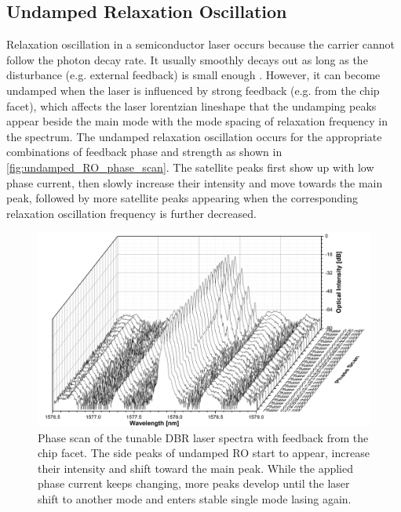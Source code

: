 
\subsection{Undamped Relaxation Oscillation}\label{subsec:undamped_RO}
Relaxation oscillation in a semiconductor laser occurs because the carrier cannot follow the photon decay rate. It usually smoothly decays out as long as the disturbance (e.g. external feedback) is small enough \cite{ohtsubo2012semiconductor}. However, it can become undamped when the laser is influenced by strong feedback (e.g. from the chip facet), which affects the laser lorentzian lineshape that the undamping peaks appear beside the main mode with the mode spacing of relaxation frequency in the spectrum. The undamped relaxation oscillation occurs for the appropriate combinations of feedback phase and strength as shown in \autoref{fig:undamped_RO_phase_scan}. The satellite peaks first show up with low phase current, then slowly increase their intensity and move towards the main peak, followed by more satellite peaks appearing when the corresponding relaxation oscillation frequency is further decreased.

\begin{figure}[ht]
    \centering
    \includegraphics[width=.8\linewidth]{figures/Undamped_RO_phase_scan_grating_4621.png}
    \caption{Phase scan of the tunable DBR laser spectra with feedback from the chip facet. The side peaks of undamped RO start to appear, increase their intensity and shift toward the main peak. While the applied phase current keeps changing, more peaks develop until the laser shift to another mode and enters stable single mode lasing again.}
    \label{fig:undamped_RO_phase_scan}
\end{figure}

